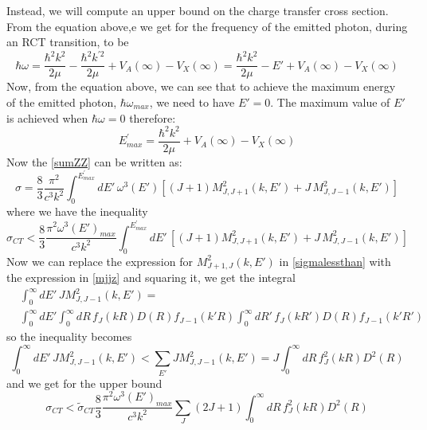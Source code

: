 Instead, we will compute an upper bound on the charge transfer cross section.
From the equation above,e we get for the frequency of the emitted photon, during an RCT transition, to be
\begin{equation}
\hbar\omega = \frac{\hbar^2 k^2}{2\mu} - \frac{\hbar^2 k^{'2}}{2\mu} + V_A(\infty) - V_X(\infty) = \frac{\hbar^2 k^2}{2\mu} - E' + V_A(\infty) - V_X(\infty)
\end{equation}
Now, from the equation above, we can see that to achieve the maximum energy of the emitted photon, $ \hbar\omega_{max} $, we need to have $ E' = 0 $.
The maximum value of $ E' $ is achieved when $ \hbar\omega = 0 $ therefore:
\begin{equation}
  E_{max}^{'} = \frac{\hbar^2 k^2}{2\mu} + V_A(\infty) - V_X(\infty)
\end{equation}
Now the \eqref{sumZZ} can be written as:
\begin{equation}
  \sigma = \frac{8}{3}\frac{\pi^2}{c^3k^2}\int_0^{E_{max}^{'}}{dE'\,\omega^3(E')\left[(J+1)M_{J,J+1}^2(k,E')+J\,M_{J,J-1}^2(k,E')\right]}
\end{equation}
where we have the inequality
\begin{equation}\label{sigmalessthan}
  \sigma_{CT} < \frac{8}{3}\frac{\pi^2\omega^3(E')_{max}}{c^3k^2}\int_0^{E_{max}^{'}}{dE'\,\left[(J+1)M_{J,J+1}^2(k,E')+J\,M_{J,J-1}^2(k,E')\right]}
\end{equation}
Now we can replace the expression for $ M_{J+1,J}^2(k,E') $ in \eqref{sigmalessthan} with the expression in \eqref{mjjz} and squaring it, we get the integral
\begin{equation}
\begin{split}
& \int_0^{\infty}{dE'\,JM_{J,J-1}^2(k,E')} = \\[.8em] 
  & \int_0^{\infty}{dE'\int_{0}^{\infty}{dR\,f_J(kR)D(R)f_{J-1}(k'R)}\int_{0}^{\infty}{dR'\,f_J(kR')D(R)f_{J-1}(k'R')}   }
\end{split}
\end{equation}
so the inequality becomes
\begin{equation}
  \int_0^{\infty}{dE'\,JM_{J,J-1}^2(k,E')} < \sum_{E'}{JM_{J,J-1}^2(k,E')} = J\int_{0}^{\infty}{dR\,f_J^2(kR)D^2(R)}
\end{equation}
and we get for the upper bound
\begin{equation}\label{sigmaUpper}
  \sigma_{CT} < \tilde{\sigma}_{CT}\frac{8}{3}\frac{\pi^2\omega^3(E')_{max}}{c^3k^2}\sum_{J}{(2J+1)\int_{0}^{\infty}{dR\,f_J^2(kR)D^2(R)}}
\end{equation}

